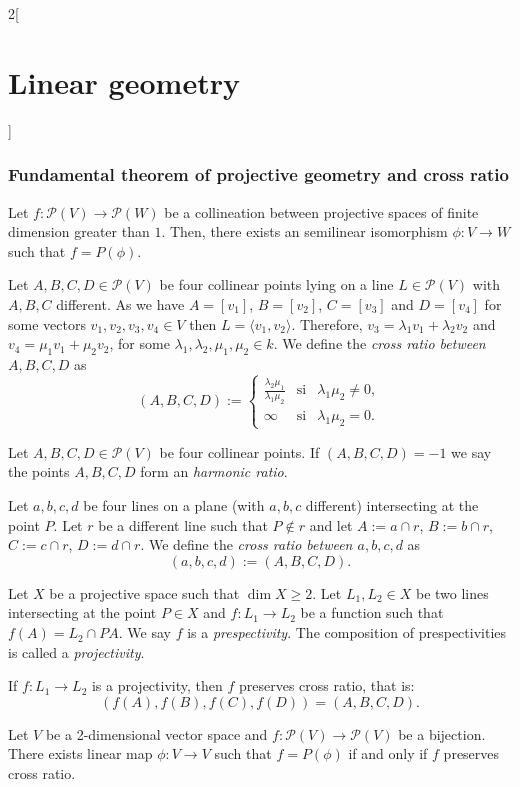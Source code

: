 \documentclass[class=article,10pt,crop=false]{standalone}
\begin{document}
\begin{multicols}{2}[\section{Linear geometry}]
\subsubsection{Fundamental theorem of projective geometry and cross ratio}
\begin{theorem}
Let $f:\mathcal{P}(V)\rightarrow \mathcal{P}(W)$ be a collineation between projective spaces of finite dimension greater than $1$. Then, there exists an semilinear isomorphism $\phi:V\rightarrow W$ such that $f=P(\phi)$.
\end{theorem}
\begin{definition}
Let $A,B,C,D\in\mathcal{P}(V)$ be four collinear points lying on a line $L\in\mathcal{P}(V)$ with $A,B,C$ different. As we have $A=[v_1]$, $B=[v_2]$, $C=[v_3]$ and $D=[v_4]$ for some vectors $v_1,v_2,v_3,v_4\in V$ then $L=\langle v_1,v_2\rangle$. Therefore, $v_3=\lambda_1v_1+\lambda_2v_2$ and $v_4=\mu_1v_1+\mu_2v_2$, for some $\lambda_1,\lambda_2,\mu_1,\mu_2\in k$. We define the \textit{cross ratio between $A,B,C,D$} as $$(A,B,C,D):=\left\{\begin{array}{ccc}
    \displaystyle\frac{\lambda_2\mu_1}{\lambda_1\mu_2} & \text{si} & \lambda_1\mu_2\ne0, \\
    \infty & \text{si} & \lambda_1\mu_2=0.
\end{array}\right.$$ 
\end{definition}
\begin{definition}
Let $A,B,C,D\in\mathcal{P}(V)$ be four collinear points. If $(A,B,C,D)=-1$ we say the points $A,B,C,D$ form an \textit{harmonic ratio}.
\end{definition}
\begin{definition}
Let $a,b,c,d$ be four lines on a plane (with $a,b,c$ different) intersecting at the point $P$. Let $r$ be a different line such that $P\notin r$ and let $A:=a\cap r$, $B:=b\cap r$, $C:=c\cap r$, $D:=d\cap r$. We define the \textit{cross ratio between $a,b,c,d$} as $$(a,b,c,d):=(A,B,C,D).$$
\end{definition}
\begin{definition}
Let $X$ be a projective space such that $\dim X\geq 2$. Let $L_1,L_2\in X$ be two lines intersecting at the point $P\in X$ and $f:L_1\rightarrow L_2$ be a function such that $f(A)=L_2\cap PA$. We say $f$ is a \textit{prespectivity}. The composition of prespectivities is called a \textit{projectivity}.
\end{definition}
\begin{theorem}
If $f:L_1\rightarrow L_2$ is a projectivity, then $f$ preserves cross ratio, that is: $$(f(A),f(B),f(C),f(D))=(A,B,C,D).$$
\end{theorem}
\begin{theorem}
Let $V$ be a 2-dimensional vector space and $f:\mathcal{P}(V)\rightarrow \mathcal{P}(V)$ be a bijection. There exists linear map $\phi:V\rightarrow V$ such that $f=P(\phi)$ if and only if $f$ preserves cross ratio.
\end{theorem}

\end{multicols}
\end{document}
